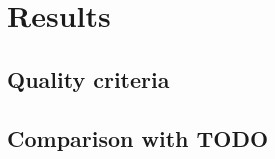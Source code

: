 \chapter{Results}
\label{chap4}

\section{Quality criteria}
\label{sub4.1}

\section{Comparison with TODO}
\label{sub4.2}